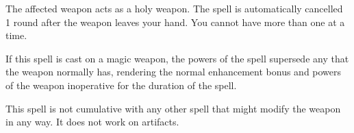 \spellrng{\rngtouch}
\spelldur{\durmed}
\begin{spelleffect}
  The affected weapon acts as a  holy weapon. The spell is automatically cancelled 1 round after the weapon leaves your hand. You cannot have more than one  at a time.
  \par If this spell is cast on a magic weapon, the powers of the spell supersede any that the weapon normally has, rendering the normal enhancement bonus and powers of the weapon inoperative for the duration of the spell.
\end{spelleffect}
\begin{spellnotes}
  This spell is not cumulative with any other spell that might modify the weapon in any way. It does not work on artifacts.
\end{spellnotes}

